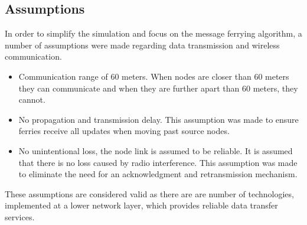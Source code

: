 \subsection{Assumptions}

In order to simplify the simulation and focus on the message ferrying algorithm, a number of assumptions were made regarding data transmission and wireless communication.

\begin{itemize}
\item Communication range of 60 meters.
When nodes are closer than 60 meters they can communicate and when they are further apart than 60 meters, they cannot.

\item No propagation and transmission delay.
This assumption was made to ensure ferries receive all updates when moving past source nodes.

\item No unintentional loss, the node link is assumed to be reliable. 
It is assumed that there is no loss caused by radio interference. 
This assumption was made to eliminate the need for an acknowledgment and retransmission mechanism.

\end{itemize}

These assumptions are considered valid as there are are number of technologies, implemented at a lower network layer, which provides reliable data transfer services.


